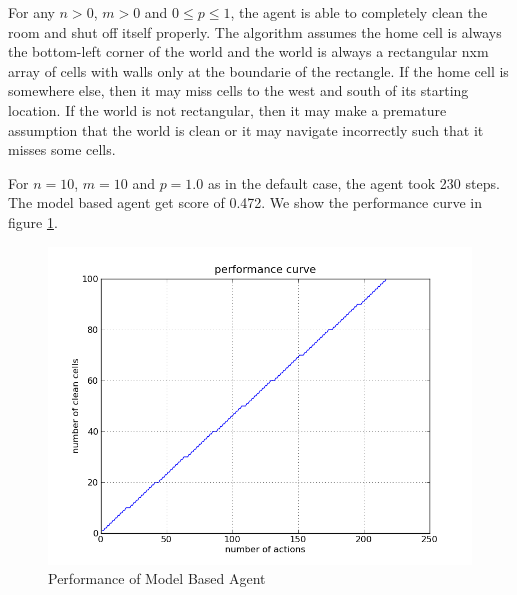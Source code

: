 For any $n>0$, $m>0$ and $0\le p \le1$, the agent is able to completely clean the room and shut off itself properly. The algorithm assumes the home cell is always the bottom-left corner of the world and the world is always a rectangular nxm array of cells with walls only at the boundarie of the rectangle. If the home cell is somewhere else, then it may miss cells to the west and south of its starting location. If the world is not rectangular, then it may make a premature assumption that the world is clean or it may navigate incorrectly such that it misses some cells.

For $n=10$, $m=10$ and $p=1.0$ as in the default case, the agent took 230 steps. The model based agent get score of 0.472. We show the performance curve in figure \ref{fig:agent3}.

\begin{figure}[!h]
\centering
\includegraphics[scale=.35]{img/agent3.png}
\caption{Performance of Model Based Agent}
\label{fig:agent3}
\end{figure}
